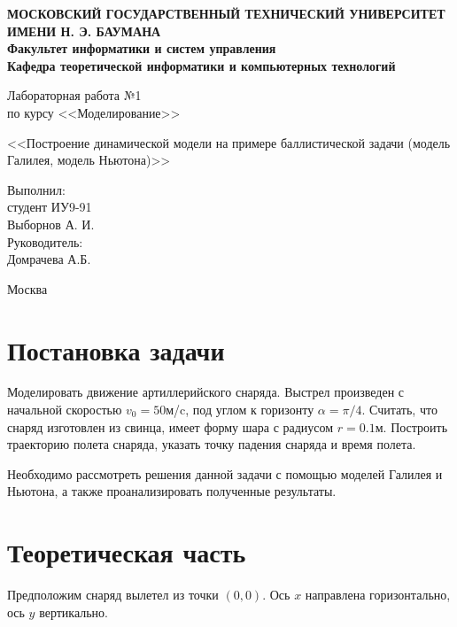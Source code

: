 \documentclass[12pt,a4paper,oneside]{extarticle}
\begin{document}
\pgfplotsset{compat=1.8}

\thispagestyle{empty}
\newpage
{
\centering


\textbf{
МОСКОВСКИЙ ГОСУДАРСТВЕННЫЙ ТЕХНИЧЕСКИЙ УНИВЕРСИТЕТ ИМЕНИ Н. Э. БАУМАНА \\
Факультет информатики и систем управления \\
Кафедра теоретической информатики и компьютерных технологий}
\bigskip
\bigskip
\bigskip
\bigskip
\bigskip
\bigskip
\bigskip

\vfill


Лабораторная работа №1 \\
по курсу <<Моделирование>>

\bigskip

{\large <<Построение динамической модели на примере баллистической задачи (модель Галилея, модель Ньютона)>>}
\bigskip

\vfill



\hfill\parbox{4cm} {
Выполнил:\\
студент ИУ9-91 \hfill \\
Выборнов А. И.\hfill \medskip\\
Руководитель:\\
Домрачева А.Б.\hfill
}


\vspace{\fill}

Москва \number\year
\clearpage
}



\clearpage


\section{Постановка задачи}
    Моделировать движение артиллерийского снаряда. Выстрел произведен с начальной скоростью $v_0=50$м/c, под углом к горизонту $\alpha=\pi/4$. Считать, что снаряд изготовлен из свинца,  имеет форму шара с радиусом  $r=0.1$м. Построить траекторию полета снаряда, указать точку падения снаряда и время полета.

    Необходимо рассмотреть решения данной задачи с помощью моделей Галилея и Ньютона, а также проанализировать полученные результаты.

\section{Теоретическая часть}
    Предположим снаряд вылетел из точки $(0,0)$. Ось $x$ направлена горизонтально, ось $y$ вертикально.
\end{document}
